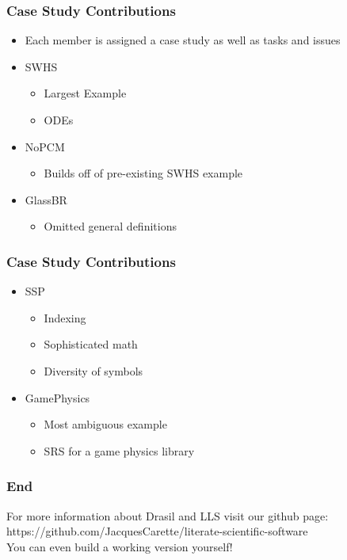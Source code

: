 \documentclass{beamer}
\begin{document}
\begin{frame}
\frametitle{Case Study Contributions}
\begin{itemize}
\item Each member is assigned a case study as well as tasks and issues\newline
\item<1-> SWHS\newline
  \begin{itemize}
    \item Largest Example\newline
    \item ODEs\newline
  \end{itemize}
\item<2-> NoPCM\newline
  \begin{itemize}
    \item Builds off of pre-existing SWHS example\newline
  \end{itemize}
\item<3-> GlassBR\newline
  \begin{itemize}
    \item Omitted general definitions\newline
  \end{itemize}
\end{itemize}
\end{frame}

\begin{frame}
\frametitle{Case Study Contributions}
\begin{itemize}
\item<1-> SSP\newline
  \begin{itemize}
    \item Indexing\newline
    \item Sophisticated math\newline
    \item Diversity of symbols\newline
  \end{itemize}
\item<2-> GamePhysics\newline
  \begin{itemize}
    \item Most ambiguous example\newline
    \item SRS for a game physics library\newline
  \end{itemize}
\end{itemize}
\end{frame}

\begin{frame}
\frametitle{End}
For more information about Drasil and LLS visit our github page: \\
https://github.com/JacquesCarette/literate-scientific-software \\
\alert{You can even build a working version yourself!}
\end{frame}
\end{document}
